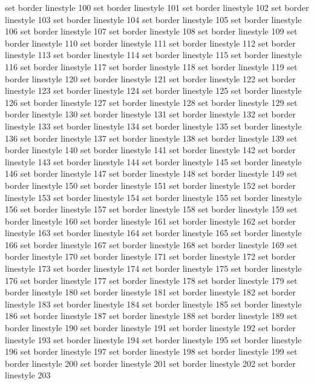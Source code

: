 set border linestyle 100
set border linestyle 101
set border linestyle 102
set border linestyle 103
set border linestyle 104
set border linestyle 105
set border linestyle 106
set border linestyle 107
set border linestyle 108
set border linestyle 109
set border linestyle 110
set border linestyle 111
set border linestyle 112
set border linestyle 113
set border linestyle 114
set border linestyle 115
set border linestyle 116
set border linestyle 117
set border linestyle 118
set border linestyle 119
set border linestyle 120
set border linestyle 121
set border linestyle 122
set border linestyle 123
set border linestyle 124
set border linestyle 125
set border linestyle 126
set border linestyle 127
set border linestyle 128
set border linestyle 129
set border linestyle 130
set border linestyle 131
set border linestyle 132
set border linestyle 133
set border linestyle 134
set border linestyle 135
set border linestyle 136
set border linestyle 137
set border linestyle 138
set border linestyle 139
set border linestyle 140
set border linestyle 141
set border linestyle 142
set border linestyle 143
set border linestyle 144
set border linestyle 145
set border linestyle 146
set border linestyle 147
set border linestyle 148
set border linestyle 149
set border linestyle 150
set border linestyle 151
set border linestyle 152
set border linestyle 153
set border linestyle 154
set border linestyle 155
set border linestyle 156
set border linestyle 157
set border linestyle 158
set border linestyle 159
set border linestyle 160
set border linestyle 161
set border linestyle 162
set border linestyle 163
set border linestyle 164
set border linestyle 165
set border linestyle 166
set border linestyle 167
set border linestyle 168
set border linestyle 169
set border linestyle 170
set border linestyle 171
set border linestyle 172
set border linestyle 173
set border linestyle 174
set border linestyle 175
set border linestyle 176
set border linestyle 177
set border linestyle 178
set border linestyle 179
set border linestyle 180
set border linestyle 181
set border linestyle 182
set border linestyle 183
set border linestyle 184
set border linestyle 185
set border linestyle 186
set border linestyle 187
set border linestyle 188
set border linestyle 189
set border linestyle 190
set border linestyle 191
set border linestyle 192
set border linestyle 193
set border linestyle 194
set border linestyle 195
set border linestyle 196
set border linestyle 197
set border linestyle 198
set border linestyle 199
set border linestyle 200
set border linestyle 201
set border linestyle 202
set border linestyle 203
